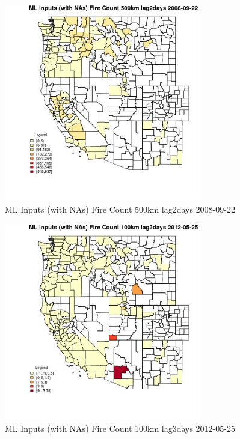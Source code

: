 \begin{figure} 
\centering  
\includegraphics[width=0.77\textwidth]{Code_Outputs/Report_ML_input_PM25_Step4_part_e_de_duplicated_aves_compiled_2019-05-18wNAs_CountyFire_Count_500km_lag2daysMean2008-09-22.jpg} 
\caption{\label{fig:Report_ML_input_PM25_Step4_part_e_de_duplicated_aves_compiled_2019-05-18wNAsCountyFire_Count_500km_lag2daysMean2008-09-22}ML Inputs (with NAs) Fire Count 500km lag2days 2008-09-22} 
\end{figure} 
 

\begin{figure} 
\centering  
\includegraphics[width=0.77\textwidth]{Code_Outputs/Report_ML_input_PM25_Step4_part_e_de_duplicated_aves_compiled_2019-05-18wNAs_CountyFire_Count_100km_lag3daysMean2012-05-25.jpg} 
\caption{\label{fig:Report_ML_input_PM25_Step4_part_e_de_duplicated_aves_compiled_2019-05-18wNAsCountyFire_Count_100km_lag3daysMean2012-05-25}ML Inputs (with NAs) Fire Count 100km lag3days 2012-05-25} 
\end{figure} 
 

